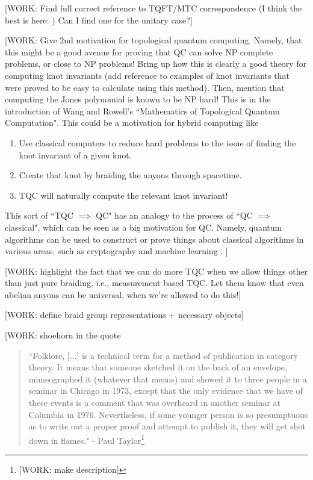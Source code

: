 \documentclass{article}
\theoremstyle{definition}
\numberwithin{figure}{section}
\begin{document}
[WORK: Find full correct reference to TQFT/MTC correspondence (I think the best is here: \cite{bartlett2015modular}) Can I find one for the unitary case?]

[WORK: Give 2nd motivation for topological quantum computing. Namely, that this might be a good avenue for proving that QC can solve NP complete problems, or close to NP problems! Bring up how this is clearly a good theory for computing knot invariants (add reference to examples of knot invariants that were proved to be easy to calculate using this method). Then, mention that computing the Jones polynomial is known to be NP hard! This is in the introduction of Wang and Rowell's ``Mathematics of Topological Quantum Computation". This could be a motivation for hybrid computing like

\begin{enumerate}
\item Use classical computers to reduce hard problems to the issue of finding the knot invariant of a given knot.
\item Create that knot by braiding the anyons through spacetime.
\item TQC will naturally compute the relevant knot invariant!
\end{enumerate}

This sort of ``TQC $\implies$ QC" has an analogy to the process of ``QC $\implies$ classical", which can be seen as a big motivation for QC. Namely, quantum algorithms can be used to construct or prove things about classical algorithms in various areas, such as cryptography \cite{regev2009lattices} and machine learning \cite{tang2019quantum}.
]


[WORK: highlight the fact that we can do more TQC when we allow things other than just pure braiding, i.e., measurement based TQC. Let them know that even abelian anyons can be universal, when we're allowed to do this!]

[WORK: define braid group representations + necessary objects]

[WORK: shoehorn in the quote

\begin{quote}
``Folklore, [...] is a technical term for a method of publication in category theory. It means that someone sketched it on the back of an envelope, mimeographed it (whatever that means) and showed it to three people in a seminar in Chicago in 1973, except that the only evidence that we have of these events is a comment that was overheard in another seminar at Columbia in 1976. Nevertheless, if some younger person is so presumptuous as to write out a proper proof and attempt to publish it, they will get shot down in flames." - Paul Taylor\footnote{[WORK: make description]\cite{aubert2019categories}}
\end{quote}
\end{document}

